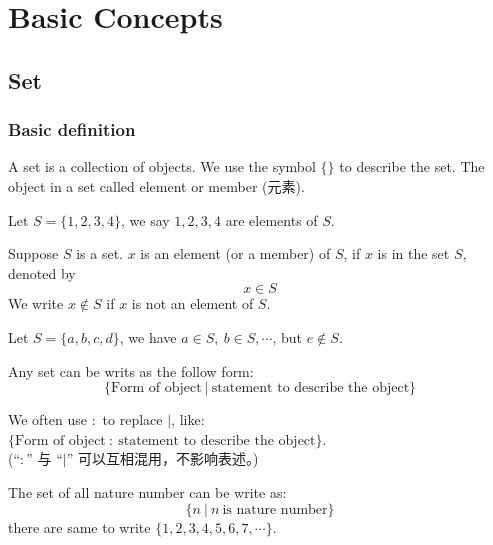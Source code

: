 \documentclass[
	UTF-8,
	11pt, %
	a4paper, %
]{LegrandOrangeBook}
\begin{document}
\renewcommand{\setminus}{\backslash}

\chapter{Basic Concepts}

\section{Set}

\subsection{Basic definition}

\begin{definition}[Set]
	A set is a collection of objects. We use the symbol $\{ \}$ to describe the set.
	The object in a set called element or member (元素).
\end{definition}

\begin{example}
	Let $S = \{ 1,2,3,4 \}$, we say $1,2,3,4$ are elements of $S$.
\end{example}

\begin{definition}
	Suppose $S$ is a set. $x$ is an element (or a member) of $S$, if $x$ is in the set $S$, denoted by
	$$x \in S$$
	We write $x \notin S$ if $x$ is not an element of $S$.
\end{definition}

\begin{example}
	Let $S = \{ a,b,c,d \}$, we have $a \in S,\ b\in S, \cdots$, but $e \notin S$.
\end{example}


\begin{definition}
	Any set can be writs as the follow form:
	$$\{ \text{Form of object} \ |\ \text{statement to describe the object} \}$$
\end{definition}

\begin{remark}
	We often use $:$ to replace $|$, like: $\{ \text{Form of object} \ :\ \text{statement to describe the object} \}$.\\
	(“$:$” 与 “$|$” 可以互相混用，不影响表述。)
\end{remark}

\begin{example}
	The set of all nature number can be write as:
	$$
	\{ n\ |\ n\ \text{is nature number} \}
	$$
	there are same to write $\{1,2,3,4,5,6,7,\cdots\}$.
\end{example}
\end{document}
